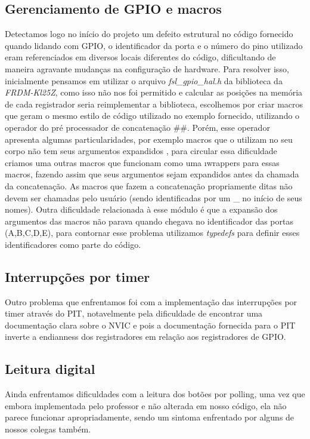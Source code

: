 \documentclass{article}
\begin{document}
\subsection{Gerenciamento de GPIO e macros}
Detectamos logo no início do projeto um defeito estrutural no código fornecido quando lidando com GPIO, o identificador da porta e o número do pino utilizado eram referenciados em diversos locais diferentes do código, dificultando de maneira agravante mudanças na configuração de hardware. Para resolver isso, inicialmente pensamos em utilizar o arquivo \textit{fsl\_gpio\_hal.h} da biblioteca da \textit{FRDM-Kl25Z}, como isso não nos foi permitido e calcular as posições na memória de cada registrador seria reimplementar a biblioteca, escolhemos por criar macros que geram o mesmo estilo de código utilizado no exemplo fornecido, utilizando o operador do pré processador de concatenação \#\#. Porém, esse operador apresenta algumas particularidades, por exemplo macros que o utilizam no seu corpo não tem seus argumentos expandidos \cite{bb:preprocessor}, para circular essa dificuldade criamos uma outras macros que funcionam como uma \i{wrappers} para essas macros, fazendo assim que seus argumentos sejam expandidos antes da chamada da concatenação. As macros que fazem a concatenação propriamente ditas não devem ser chamadas pelo usuário (sendo identificadas por um \_ no início de seus nomes).
Outra dificuldade relacionada à esse módulo é que a expansão dos argumentos das macros não parava quando chegava no identificador das portas (A,B,C,D,E), para contornar esse problema utilizamos \textit{typedefs} para definir esses identificadores como parte do código.

\subsection{Interrupções por timer}
Outro problema que enfrentamos foi com a implementação das interrupções por timer através do PIT, notavelmente pela dificuldade de encontrar uma documentação clara sobre o NVIC e pois a documentação fornecida para o PIT inverte a endianness dos registradores em relação aos registradores de GPIO.

\subsection{Leitura digital}
Ainda enfrentamos dificuldades com a leitura dos botões por polling, uma vez que embora implementada pelo professor e não alterada em nosso código, ela não parece funcionar apropriadamente, sendo um sintoma enfrentado por alguns de nossos colegas também.
\end{document}
